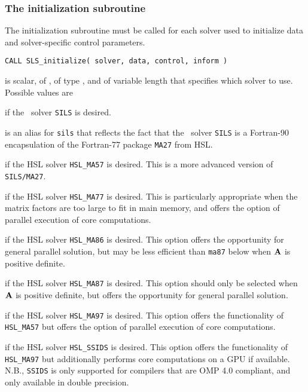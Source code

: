 \documentclass{galahad}
\newcommand{\packagename}{SLS}
\begin{document}

\subsubsection{The initialization subroutine}\label{subinit}
The initialization subroutine must be called for each solver used
to initialize data and solver-specific control parameters.

\hskip0.5in
{\tt CALL \packagename\_initialize( solver, data, control, inform )}
\begin{description}

 is scalar, of \intentin, of type \character, and of variable
length that specifies which solver to use. Possible values are
\begin{description}
 if the \galahad\ solver {\tt SILS} is desired.

 is an alias for {\tt sils} that reflects the fact that the \galahad\
 solver {\tt SILS} is a Fortran-90 encapsulation of the Fortran-77
 package {\tt MA27} from HSL.

 if the HSL solver {\tt HSL\_MA57} is desired. This is a more
advanced version of {\tt SILS/MA27}.

 if the HSL solver {\tt HSL\_MA77} is desired. This is particularly
appropriate when the matrix factors are too large to fit in main memory,
and offers the option of parallel execution of core computations.

 if the HSL solver {\tt HSL\_MA86} is desired. This option
offers the opportunity for general parallel solution, but may be
less efficient than {\tt ma87} below when ${\mathbf{A}}$ is positive definite.

 if the HSL solver {\tt HSL\_MA87} is desired. This option should
only be selected when ${\mathbf{A}}$ is positive definite, but
offers the opportunity for general parallel solution.

 if the HSL solver {\tt HSL\_MA97} is desired. This option offers
the functionality of {\tt HSL\_MA57} but offers the option of parallel
execution of core computations.

 if the HSL solver {\tt HSL\_SSIDS} is desired. This option offers
the functionality of {\tt HSL\_MA97} but additionally performs
core computations on a GPU if available. N.B., {\tt SSIDS} is only
supported for compilers that are OMP 4.0 compliant, and only available
in double precision.


\end{description}
\end{description}
\end{document}
